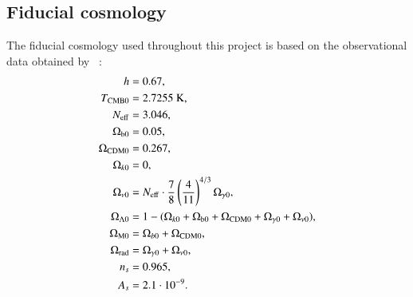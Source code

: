 \subsection*{Fiducial cosmology}
The fiducial cosmology used throughout this project is based on the observational data obtained by ~\cite{Planck2020}:
\begin{equation*}
        \begin{split}
                h &= 0.67, \\
                T_\mathrm{CMB0} &= 2.7255\text{ {K}}, \\
                N_\mathrm{eff} &= 3.046, \\
                \Omega_\mathrm{b0} &= 0.05, \\
                \Omega_\mathrm{CDM0} &= 0.267, \\
                \Omega_{k0} &= 0, \\
                \Omega_{\nu0} &= N_\mathrm{eff} \cdot \frac{7}{8}\left(\frac{4}{11}\right)^{4/3}\Omega_{\gamma0}, \\
                \Omega_{\Lambda0} &= 1- (\Omega_{k0} + \Omega_\mathrm{b0} + \Omega_\mathrm{CDM0} + \Omega_{\gamma0} + \Omega_{\nu0}),\\
                \Omega_\mathrm{M0} &= \Omega_{b0} + \Omega_\mathrm{CDM0}, \\
                \Omega_\mathrm{rad} &= \Omega_{\gamma0} + \Omega_{\nu0},\\
                n_s &= 0.965, \\
                A_s &= 2.1\cdot10^{-9}.
        \end{split}
\end{equation*}